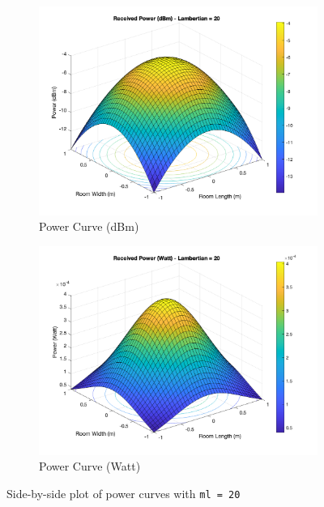 \documentclass[12pt]{article}
\begin{document}
    \begin{figure}[htbp]
        \centering
        \begin{subfigure}[b]{0.45\textwidth}
            \includegraphics[width=\textwidth]{images/3D_power_curve_dBm_20.png}
            \caption{Power Curve (dBm)}
            \label{fig:power_curve_dBm}
        \end{subfigure}
        \hfill
        \begin{subfigure}[b]{0.45\textwidth}
            \includegraphics[width=\textwidth]{images/3D_power_curve_Watt_20.png}
            \caption{Power Curve (Watt)}
            \label{fig:power_curve_Watt}
        \end{subfigure}
        \caption{Side-by-side plot of power curves with \texttt{ml = 20}}
        \label{fig:power_curves}
    \end{figure}
\end{document}
